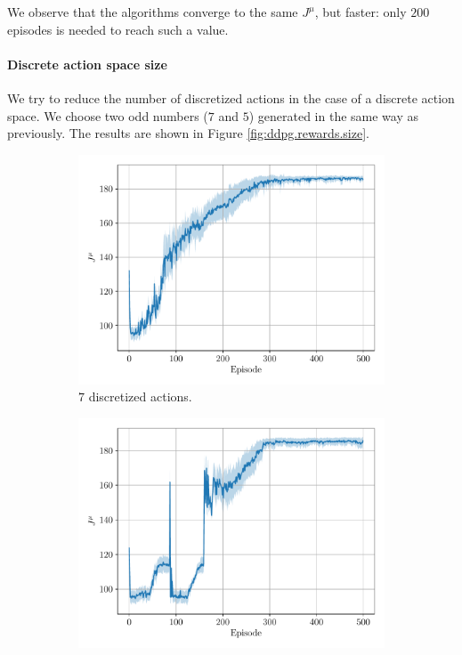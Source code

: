 \documentclass[a4paper, 12pt]{article}
\begin{document}
    We observe that the algorithms converge to the same $J^{\mu}$, but faster: only $\num{200}$ episodes is needed to reach such a value.
    
    \paragraph{Discrete action space size}
    
    We try to reduce the number of discretized actions in the case of a discrete action space. We choose two odd numbers ($7$ and $5$) generated in the same way as previously. The results are shown in Figure \ref{fig:ddpg.rewards.size}.
    
    \begin{figure}[H]
        \centering
        \begin{subfigure}{0.49\textwidth}
            \centering
            \includegraphics[width=\textwidth]{resources/pdf/ddpg_J_7_1_0.95.pdf}
            \caption{$7$ discretized actions.}
        \end{subfigure}
        \hfill
        \begin{subfigure}{0.49\textwidth}
            \centering
            \includegraphics[width=\textwidth]{resources/pdf/ddpg_J_5_1_0.95.pdf}

\end{subfigure}
\end{figure}
\end{document}
